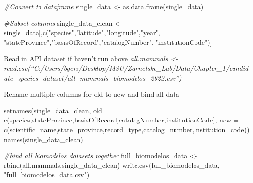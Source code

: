 \documentclass[
]{article}
\newenvironment{Shaded}{\begin{snugshade}}{\end{snugshade}}
\newcommand{\AttributeTok}[1]{\textcolor[rgb]{0.77,0.63,0.00}{#1}}
\newcommand{\CommentTok}[1]{\textcolor[rgb]{0.56,0.35,0.01}{\textit{#1}}}
\newcommand{\FunctionTok}[1]{\textcolor[rgb]{0.00,0.00,0.00}{#1}}
\newcommand{\NormalTok}[1]{#1}
\newcommand{\OtherTok}[1]{\textcolor[rgb]{0.56,0.35,0.01}{#1}}
\newcommand{\StringTok}[1]{\textcolor[rgb]{0.31,0.60,0.02}{#1}}
\begin{document}
\begin{Shaded}
\begin{Highlighting}[]
\CommentTok{\#Convert to dataframe}
\NormalTok{single\_data }\OtherTok{\textless{}{-}} \FunctionTok{as.data.frame}\NormalTok{(single\_data)}

\CommentTok{\#Subset columns}
\NormalTok{single\_data\_clean }\OtherTok{\textless{}{-}}\NormalTok{ single\_data[,}\FunctionTok{c}\NormalTok{(}\StringTok{"species"}\NormalTok{,}\StringTok{"latitude"}\NormalTok{,}\StringTok{"longitude"}\NormalTok{,}\StringTok{"year"}\NormalTok{, }\StringTok{"stateProvince"}\NormalTok{,}\StringTok{"basisOfRecord"}\NormalTok{,}\StringTok{"catalogNumber"}\NormalTok{,}
                                    \StringTok{"institutionCode"}\NormalTok{)]}
\end{Highlighting}
\end{Shaded}

Read in API dataset if haven't run above \emph{all.mammals \textless-
read.csv(``C:/Users/bgers/Desktop/MSU/Zarnetske\_Lab/Data/Chapter\_1/candidate\_species\_dataset/all\_mammals\_biomodelos\_2022.csv'')}

Rename multiple columns for old to new and bind all data

\begin{Shaded}
\begin{Highlighting}[]
\FunctionTok{setnames}\NormalTok{(single\_data\_clean, }\AttributeTok{old =} \FunctionTok{c}\NormalTok{(}\StringTok{\textquotesingle{}species\textquotesingle{}}\NormalTok{,}\StringTok{\textquotesingle{}stateProvince\textquotesingle{}}\NormalTok{,}\StringTok{\textquotesingle{}basisOfRecord\textquotesingle{}}\NormalTok{,}\StringTok{\textquotesingle{}catalogNumber\textquotesingle{}}\NormalTok{,}\StringTok{\textquotesingle{}institutionCode\textquotesingle{}}\NormalTok{), }
         \AttributeTok{new =} \FunctionTok{c}\NormalTok{(}\StringTok{\textquotesingle{}scientific\_name\textquotesingle{}}\NormalTok{,}\StringTok{\textquotesingle{}state\_province\textquotesingle{}}\NormalTok{,}\StringTok{\textquotesingle{}record\_type\textquotesingle{}}\NormalTok{,}\StringTok{\textquotesingle{}catalog\_number\textquotesingle{}}\NormalTok{,}\StringTok{\textquotesingle{}institution\_code\textquotesingle{}}\NormalTok{))}
\FunctionTok{names}\NormalTok{(single\_data\_clean)}

\CommentTok{\#bind all biomodelos datasets together}
\NormalTok{full\_biomodelos\_data }\OtherTok{\textless{}{-}} \FunctionTok{rbind}\NormalTok{(all.mammals,single\_data\_clean)}
\FunctionTok{write.csv}\NormalTok{(full\_biomodelos\_data, }\StringTok{"full\_biomodelos\_data.csv"}\NormalTok{)}
\end{Highlighting}
\end{Shaded}
\end{document}
